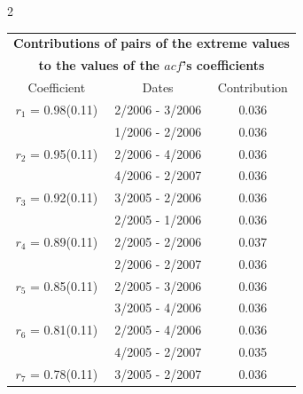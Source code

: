 
\thispagestyle{empty}
\begin{multicols}{2}{ 
\begin{tabular}{ccc}
\multicolumn{3}{c}{\textbf{Contributions of pairs of the extreme values} }  \vspace{-.10in}  \\ 
\multicolumn{3}{c}{ \textbf{to the values of the $acf$'s coefficients}} \\ 
\hline 
\hline                  Coefficient  &  Dates &  Contribution \\ 
\hline 
  $r_{ 1}$ = 0.98(0.11) &       2/2006 -  3/2006 &        0.036   \vspace{-.10in} \\  
&        1/2006 -  2/2006 &        0.036  \vspace{-.02in} \\ \hline 
  $r_{ 2}$ = 0.95(0.11) &       2/2006 -  4/2006 &        0.036   \vspace{-.10in} \\  
&        4/2006 -  2/2007 &        0.036  \vspace{-.02in} \\ \hline 
  $r_{ 3}$ = 0.92(0.11) &       3/2005 -  2/2006 &        0.036   \vspace{-.10in} \\  
&        2/2005 -  1/2006 &        0.036  \vspace{-.02in} \\ \hline 
  $r_{ 4}$ = 0.89(0.11) &       2/2005 -  2/2006 &        0.037   \vspace{-.10in} \\  
&        2/2006 -  2/2007 &        0.036  \vspace{-.02in} \\ \hline 
  $r_{ 5}$ = 0.85(0.11) &       2/2005 -  3/2006 &        0.036   \vspace{-.10in} \\  
&        3/2005 -  4/2006 &        0.036  \vspace{-.02in} \\ \hline 
  $r_{ 6}$ = 0.81(0.11) &       2/2005 -  4/2006 &        0.036   \vspace{-.10in} \\  
&        4/2005 -  2/2007 &        0.035  \vspace{-.02in} \\ \hline 
  $r_{ 7}$ = 0.78(0.11) &       3/2005 -  2/2007 &        0.036   \vspace{-.10in} \\  

\end{tabular}}
\end{multicols}
